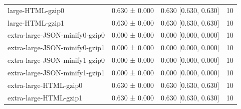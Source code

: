 \begin{tabular}{lllr}
large-HTML-gzip0 & 0.630 ± 0.000 & 0.630 [0.630, 0.630] & 10 \\
large-HTML-gzip1 & 0.630 ± 0.000 & 0.630 [0.630, 0.630] & 10 \\
extra-large-JSON-minify0-gzip0 & 0.000 ± 0.000 & 0.000 [0.000, 0.000] & 10 \\
extra-large-JSON-minify0-gzip1 & 0.000 ± 0.000 & 0.000 [0.000, 0.000] & 10 \\
extra-large-JSON-minify1-gzip0 & 0.000 ± 0.000 & 0.000 [0.000, 0.000] & 10 \\
extra-large-JSON-minify1-gzip1 & 0.000 ± 0.000 & 0.000 [0.000, 0.000] & 10 \\
extra-large-HTML-gzip0 & 0.630 ± 0.000 & 0.630 [0.630, 0.630] & 10 \\
extra-large-HTML-gzip1 & 0.630 ± 0.000 & 0.630 [0.630, 0.630] & 10 \\
\bottomrule
\end{tabular}

